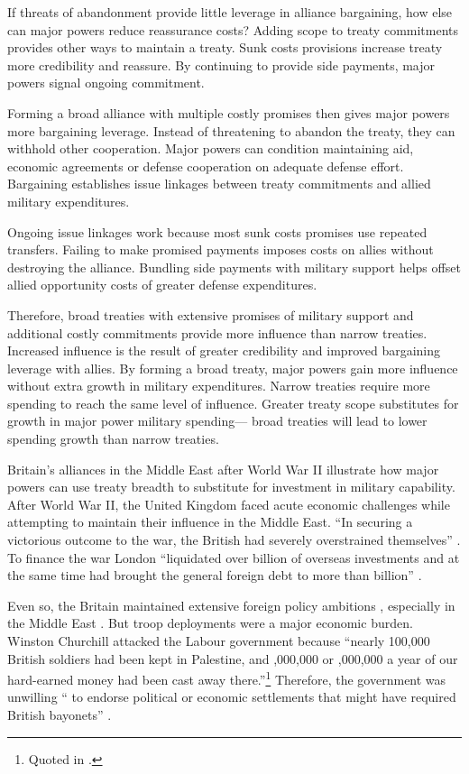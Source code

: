 \documentclass[12pt]{article}
\begin{document}
If threats of abandonment provide little leverage in alliance bargaining, how else can major powers reduce reassurance costs? 
Adding scope to treaty commitments provides other ways to maintain a treaty.
Sunk costs provisions increase treaty more credibility and reassure.
By continuing to provide side payments, major powers signal ongoing commitment. 

 
Forming a broad alliance with multiple costly promises then gives major powers more bargaining leverage. 
Instead of threatening to abandon the treaty, they can withhold other cooperation. 
Major powers can condition maintaining aid, economic agreements or defense cooperation on adequate defense effort.
Bargaining establishes issue linkages between treaty commitments and allied military expenditures. 


Ongoing issue linkages work because most sunk costs promises use repeated transfers. 
Failing to make promised payments imposes costs on allies without destroying the alliance. 
Bundling side payments with military support helps offset allied opportunity costs of greater defense expenditures. 


Therefore, broad treaties with extensive promises of military support and additional costly commitments provide more influence than narrow treaties.
Increased influence is the result of greater credibility and improved bargaining leverage with allies.  
By forming a broad treaty, major powers gain more influence without extra growth in military expenditures. 
Narrow treaties require more spending to reach the same level of influence. 
Greater treaty scope substitutes for growth in major power military spending--- broad treaties will lead to lower spending growth than narrow treaties. 


Britain's alliances in the Middle East after World War II illustrate how major powers can use treaty breadth to substitute for investment in military capability. 
After World War II, the United Kingdom faced acute economic challenges while attempting to maintain their influence in the Middle East. 
``In securing a victorious outcome to the war, the British had severely overstrained themselves'' \citep[pg. 367]{Kennedy1987}. 
To finance the war London ``liquidated over  billion of overseas investments and at the same time had brought the general foreign debt to more than  billion'' \citep[pg. 12]{Louis1984}.
 

Even so, the Britain maintained extensive foreign policy ambitions \citep{Mayhew1950}, especially in the Middle East \citep{Rahman1982}. 
But troop deployments were a major economic burden. 
Winston Churchill attacked the Labour government because ``nearly 100,000 British soldiers had been kept in Palestine, and ,000,000 or ,000,000 a year of our hard-earned money had been cast away there.''\footnote{Quoted in \citet[pg. 11]{Louis1984}.}
Therefore, the government was unwilling `` to endorse political or economic settlements that might have required British bayonets'' \citep[pg. 15]{Louis1984}. 
\end{document}
